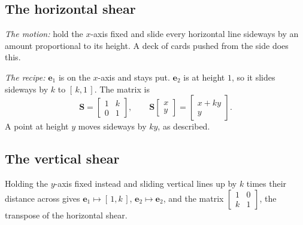 \documentclass[11pt]{article}
\theoremstyle{plain}
\theoremstyle{definition}
\theoremstyle{remark}
\newcommand{\vc}[1]{\mathbf{#1}}
\newcommand{\mt}[1]{\mathbf{#1}}
\newcommand{\Fshape}{(0.15,0.1) -- (0.35,0.1) -- (0.35,0.45) -- (0.65,0.45)
  -- (0.65,0.6) -- (0.35,0.6) -- (0.35,0.75) -- (0.8,0.75) -- (0.8,0.9)
  -- (0.15,0.9) -- cycle}
\newcommand{\actionpic}[4]{%
  \begin{scope}
    \clip (-2.2,-2.2) rectangle (2.4,2.4);
    \draw[step=1cm,gray!22,very thin] (-3,-3) grid (3,3);
  \end{scope}
  \draw[axisline] (-2.2,0) -- (2.6,0);
  \draw[axisline] (0,-2.2) -- (0,2.6);
  \draw[gray!55,dashed] (0,0) -- (1,0) -- (1,1) -- (0,1) -- cycle;
  \fill[gray!30] \Fshape;
  \begin{scope}[cm={#1,#3,#2,#4,(0,0)}]
    \fill[RoyalBlue!15] (0,0) -- (1,0) -- (1,1) -- (0,1) -- cycle;
    \draw[RoyalBlue!60] (0,0) -- (1,0) -- (1,1) -- (0,1) -- cycle;
    \fill[RoyalBlue!75] \Fshape;
  \end{scope}}
\newcommand{\eone}[2]{\draw[vecarr,BrickRed] (0,0) -- (#1,#2);}
\newcommand{\etwo}[2]{\draw[vecarr,ForestGreen] (0,0) -- (#1,#2);}
\newcommand{\piclabel}[1]{\node[font=\small,align=center,anchor=north] at (0.1,-2.45) {#1};}
\begin{document}
\subsection{The horizontal shear}
\emph{The motion:} hold the $x$-axis fixed and slide every horizontal line
sideways by an amount proportional to its height. A deck of cards pushed from
the side does this.

\emph{The recipe:} $\vc{e}_1$ is on the $x$-axis and stays put. $\vc{e}_2$ is
at height $1$, so it slides sideways by $k$ to $[\,k,1\,]$. The matrix is
\[
  \mt{S}=\begin{bmatrix}1&k\\0&1\end{bmatrix},
  \qquad
  \mt{S}\begin{bmatrix}x\\y\end{bmatrix}=\begin{bmatrix}x+ky\\y\end{bmatrix}.
\]
A point at height $y$ moves sideways by $ky$, as described.

\subsection{The vertical shear}
Holding the $y$-axis fixed instead and sliding vertical lines up by $k$ times
their distance across gives $\vc{e}_1\mapsto[\,1,k\,]$, $\vc{e}_2\mapsto\vc{e}_2$,
and the matrix $\begin{bmatrix}1&0\\k&1\end{bmatrix}$, the transpose of the
horizontal shear.

\begin{center}
\end{center}
\end{document}
